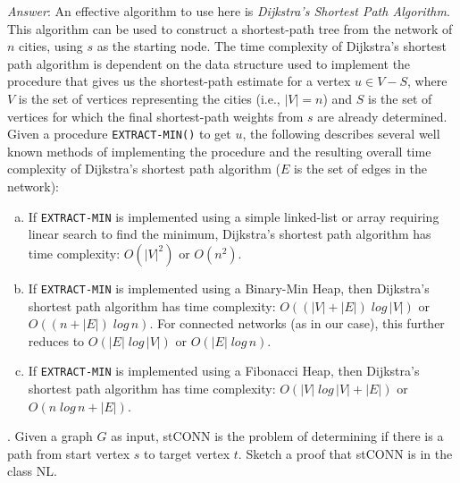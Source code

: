 \documentclass{scrartcl}
\begin{document}
    \noindent
    \textit{Answer}: An effective algorithm to use here is \emph{Dijkstra's Shortest Path
    Algorithm}. This algorithm can be used to construct a shortest-path tree from the network of $n$
    cities, using $s$ as the starting node. The time complexity of Dijkstra's shortest path
    algorithm is dependent on the data structure used to implement the procedure that gives us the
    shortest-path estimate for a vertex $u \in V - S$, where $V$ is the set of vertices representing
    the cities (i.e., $|V| = n$) and $S$ is the set of vertices for which the final shortest-path
    weights from $s$ are already determined. Given a procedure \verb|EXTRACT-MIN()| to get $u$, the
    following describes several well known methods of implementing the procedure and the resulting
    overall time complexity of Dijkstra's shortest path algorithm ($E$ is the set of edges in the
    network):
    \begin{enumerate}[(a)]
        \item If \verb|EXTRACT-MIN| is implemented using a simple linked-list or array requiring
            linear search to find the minimum, Dijkstra's shortest path algorithm has time
            complexity: $O(|V|^2)$ or $O(n^2)$.\\
        \item If \verb|EXTRACT-MIN| is implemented using a Binary-Min Heap, then Dijkstra's shortest
            path algorithm has time complexity: $O((|V| + |E|)\;log\,|V|)$ or $O((n +
            |E|)\;log\,n)$. For connected networks (as in our case), this further reduces to
            $O(|E|\;log\,|V|)$ or $O(|E|\;log\,n)$.\\
        \item If \verb|EXTRACT-MIN| is implemented using a Fibonacci Heap, then Dijkstra's shortest
            path algorithm has time complexity: $O(|V|\;log\,|V| + |E|)$ or $O(n\;log\,n + |E|)$.
    \end{enumerate}

    \bigskip
    . Given a graph $G$ as input, \textsf{stCONN} is the problem of determining if there is a path
    from start vertex $s$ to target vertex $t$. Sketch a proof that \textsf{stCONN} is in the class
    \textsf{NL}.\\
\end{document}
